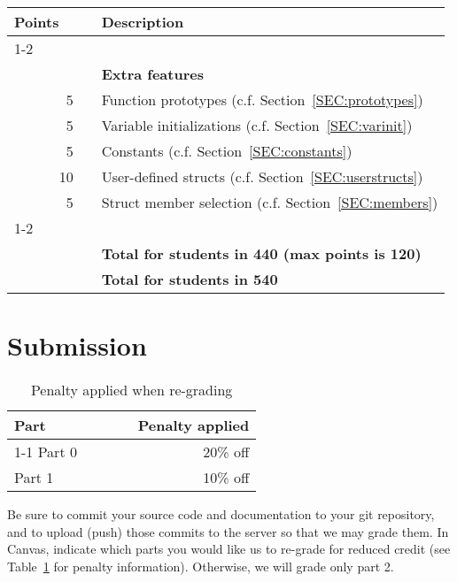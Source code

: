 \documentclass{article}
\makeatletter
\newcommand{\gradeline}{ \cline{1-2} \cline{4-4} ~\\[-1.5ex] }
\newenvironment{gradetable}{\begin{longtable}{@{}rrcp{5in}} \multicolumn{2}{l}{\bf Points} & & {\bf Description}\\ \gradeline}{\end{longtable}}
\newcommand{\mainitem}[2]{\pagebreak[2] {\bf #1} &&& {\bf #2}}
\newcommand{\inneritem}[2]{~ & #1 && #2}
\newcommand{\thispart}{2}
\makeatother
\begin{document}
\begin{gradetable}
  \mainitem{30}{Extra features}
  \\[2mm]
    \inneritem{5}{Function prototypes (c.f. Section~\ref{SEC:prototypes})}
  \\
    \inneritem{5}{Variable initializations (c.f. Section~\ref{SEC:varinit})}
  \\
    \inneritem{5}{Constants (c.f. Section~\ref{SEC:constants})}
  \\
    \inneritem{10}{User-defined structs (c.f. Section~\ref{SEC:userstructs})}
  \\
    \inneritem{5}{Struct member selection (c.f. Section~\ref{SEC:members})}
  \\[4mm]

  \gradeline
  \mainitem{100}{Total for students in 440 (max points is 120)}
  \\
  \mainitem{115}{Total for students in 540}
\end{gradetable}


\section{Submission}

\begin{table}[h]
\centering

  \begin{tabular}{lcr}
    {\bf Part} & ~~~~ & {\bf Penalty applied} \\ \cline{1-1}\cline{3-3}
    Part 0 && 20\% off \\
    Part 1 && 10\% off
  \end{tabular}

\caption{Penalty applied when re-grading}
\label{TAB:penalties}
\end{table}

Be sure to commit your source code and documentation to your
git repository, and to upload (push) those commits to the server
so that we may grade them.
In Canvas,
indicate which parts you would like us to re-grade for reduced credit
(see Table~\ref{TAB:penalties} for penalty information).
Otherwise, we will grade only part \thispart.
\end{document}
